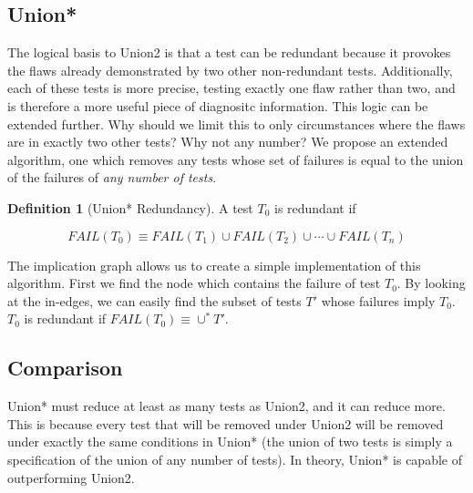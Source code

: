 \documentclass[11pt,twoside]{article}
\newcommand\fail{\mathit{FAIL}}
\theoremstyle{definition}
\newtheorem{defn}{Definition}
\let\cite=\citep
\begin{document}
\subsection{Union*}
The logical basis to Union2 is that a test can be redundant because it provokes the flaws already demonstrated by two other non-redundant tests\cite{Claessen}. Additionally, each of these tests is more precise, testing exactly one flaw rather than two, and is therefore a more useful piece of diagnositc information. This logic can be extended further. Why should we limit this to only circumstances where the flaws are in exactly two other tests? Why not any number? We propose an extended algorithm, one which removes any tests whose set of failures is equal to the union of the failures of \emph{any number of tests}. 

\begin{defn}[Union* Redundancy]
A test $T_0$ is redundant if

$$\fail (T_0) \equiv \fail(T_1) \cup \fail(T_2) \cup \cdots \cup \fail(T_n) $$
\end{defn}

The implication graph allows us to create a simple implementation of this algorithm. First we find the node which contains the failure of test $T_0$. By looking at the in-edges, we can easily find the subset of tests $T'$ whose failures imply $T_0$. $T_0$ is redundant if \mbox{$\fail(T_0) \equiv \cup^* T'$}.

\subsection{Comparison}
Union* must reduce at least as many tests as Union2, and it can reduce more. This is because every test that will be removed under Union2 will be removed under exactly the same conditions in Union* (the union of two tests is simply a specification of the union of any number of tests). In theory, Union* is capable of outperforming Union2.
\end{document}
